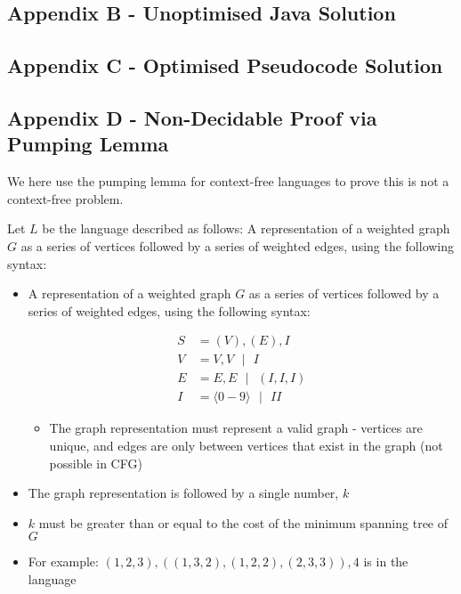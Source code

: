\documentclass{article}
\begin{document}

\subsection*{Appendix B - Unoptimised Java Solution}


\subsection*{Appendix C - Optimised Pseudocode Solution}


\subsection*{Appendix D - Non-Decidable Proof via Pumping Lemma}

We here use the pumping lemma for context-free languages to prove this is not a context-free problem.

Let $L$ be the language described as follows:
A representation of a weighted graph $G$ as a series of vertices followed by a series of weighted edges, using the following syntax:

\begin{itemize}
	\item A representation of a weighted graph $G$ as a series of vertices followed by a series of weighted edges, using the following syntax:
    
    \begin{align*}
		S &= (V), (E), I \\
		V &= V,V \textrm{ } | \textrm{ } I \\
		E &= E,E \textrm{ } | \textrm{ } (I, I, I) \\
		I &= \langle 0-9 \rangle \textrm{ } | \textrm{ } II
    \end{align*}
    
    \begin{itemize}
		\item The graph representation must represent a valid graph - vertices are unique, and edges are only between vertices that exist in the graph (not possible in CFG)
	\end{itemize}

	\item The graph representation is followed by a single number, $k$
	\item $k$ must be greater than or equal to the cost of the minimum spanning tree of $G$
	\item For example: $(1, 2, 3),((1, 3, 2), (1, 2, 2), (2, 3, 3)), 4$ is in the language
\end{itemize}
\end{document}
